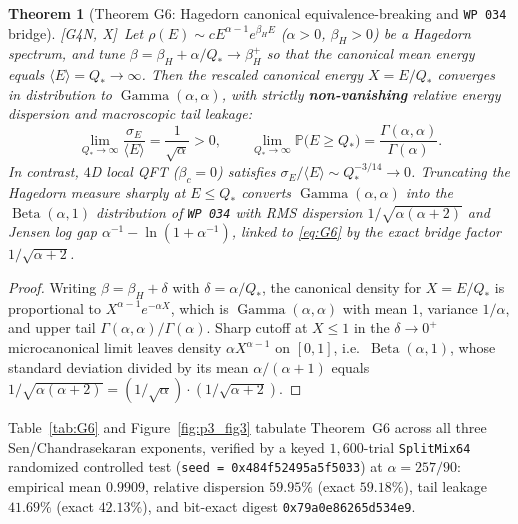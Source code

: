 \documentclass[11pt]{amsart}
\numberwithin{equation}{section}
\theoremstyle{plain}
\newtheorem{theorem}{Theorem}[section]
\theoremstyle{definition}\newtheorem{definition}[theorem]{Definition}
\theoremstyle{remark}\newtheorem{remark}[theorem]{Remark}
\newcommand{\ctag}[1]{\textup{\textsf{\scriptsize[#1]}}}
\begin{document}
\begin{theorem}[Theorem G6: Hagedorn canonical equivalence-breaking and \texttt{WP~034} bridge]\label{thm:G6}
\ctag{G4N, X}\ Let $\rho(E) \sim c E^{\alpha-1} e^{\beta_H E}$ ($\alpha > 0$, $\beta_H > 0$) be a Hagedorn spectrum, and tune $\beta = \beta_H + \alpha/Q_* \to \beta_H^+$ so that the canonical mean energy equals $\langle E \rangle = Q_* \to \infty$. Then the rescaled canonical energy $X = E/Q_*$ converges in distribution to $\operatorname{Gamma}(\alpha, \alpha)$, with strictly \textbf{non-vanishing} relative energy dispersion and macroscopic tail leakage:
\begin{equation}\label{eq:G6}
\lim_{Q_* \to \infty} \frac{\sigma_E}{\langle E \rangle} = \frac{1}{\sqrt{\alpha}} > 0, \qquad
\lim_{Q_* \to \infty} \mathbb{P}\bigl(E \ge Q_*\bigr) = \frac{\Gamma(\alpha, \alpha)}{\Gamma(\alpha)}.
\end{equation}
In contrast, $4$D local QFT ($\beta_c = 0$) satisfies $\sigma_E/\langle E \rangle \sim Q_*^{-3/14} \to 0$. Truncating the Hagedorn measure sharply at $E \le Q_*$ converts $\operatorname{Gamma}(\alpha, \alpha)$ into the $\operatorname{Beta}(\alpha, 1)$ distribution of \texttt{WP~034} with RMS dispersion $1/\sqrt{\alpha(\alpha+2)}$ and Jensen log gap $\alpha^{-1} - \ln(1 + \alpha^{-1})$, linked to \eqref{eq:G6} by the exact bridge factor $1/\sqrt{\alpha+2}$.
\end{theorem}
\begin{proof}
Writing $\beta = \beta_H + \delta$ with $\delta = \alpha/Q_*$, the canonical density for $X = E/Q_*$ is proportional to $X^{\alpha-1} e^{-\alpha X}$, which is $\operatorname{Gamma}(\alpha, \alpha)$ with mean $1$, variance $1/\alpha$, and upper tail $\Gamma(\alpha,\alpha)/\Gamma(\alpha)$. Sharp cutoff at $X \le 1$ in the $\delta \to 0^+$ microcanonical limit leaves density $\alpha X^{\alpha-1}$ on $[0,1]$, i.e.\ $\operatorname{Beta}(\alpha,1)$, whose standard deviation divided by its mean $\alpha/(\alpha+1)$ equals $1/\sqrt{\alpha(\alpha+2)} = (1/\sqrt{\alpha}) \cdot (1/\sqrt{\alpha+2})$.
\end{proof}

Table~\ref{tab:G6} and Figure~\ref{fig:p3_fig3} tabulate Theorem~G6 across all three Sen/Chandrasekaran exponents, verified by a keyed $1{,}600$-trial \texttt{SplitMix64} randomized controlled test (\texttt{seed = 0x484f52495a5f5033}) at $\alpha = 257/90$: empirical mean $0.9909$, relative dispersion $59.95\%$ (exact $59.18\%$), tail leakage $41.69\%$ (exact $42.13\%$), and bit-exact digest \texttt{0x79a0e86265d534e9}.
\end{document}
